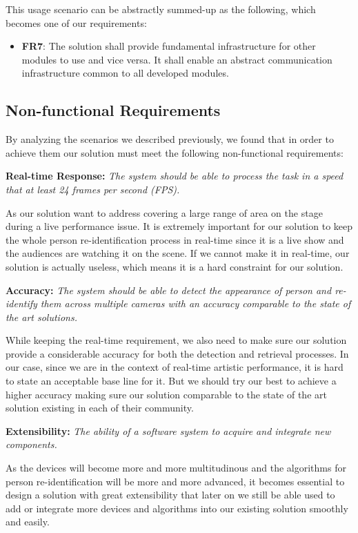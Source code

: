 This usage scenario can be abstractly summed-up as the following, which becomes
one of our requirements:

\begin{itemize}
    \item \textbf{FR7}: The solution shall provide fundamental infrastructure
    for other modules to use and vice versa. It shall enable an abstract 
    communication infrastructure common to all developed modules.
\end{itemize}

\subsection{Non-functional Requirements}
\label{sec:intro-non-func-req}

By analyzing the scenarios we described previously, we found that in order to
achieve them our solution must meet the following non-functional requirements:

\textbf{Real-time Response:} 
\textit{The system should be able to process the task in a speed that at least 
24 frames per second (FPS).}

As our solution want to address covering a large range of area on the stage 
during a live performance issue. It is extremely important for our solution to 
keep the whole person re-identification process in real-time since it is a live 
show and the audiences are watching it on the scene. If we cannot make it in 
real-time, our solution is actually useless, which means it is a hard 
constraint for our solution.

\textbf{Accuracy:} 
\textit{The system should be able to detect the appearance of person and 
re-identify them across multiple cameras with an accuracy comparable to the 
state of the art solutions.}

While keeping the real-time requirement, we also need to make sure our solution
provide a considerable accuracy for both the detection and retrieval processes.
In our case, since we are in the context of real-time artistic performance, it
is hard to state an acceptable base line for it. But we should try our best to
achieve a higher accuracy making sure our solution comparable to the state of
the art solution existing in each of their community.

\textbf{Extensibility:}
\textit{The ability of a software system to acquire and integrate new
components.}

As the devices will become more and more multitudinous and the algorithms for
person re-identification will be more and more advanced, it becomes essential
to design a solution with great extensibility that later on we still
be able used to add or integrate more devices and algorithms into our existing
solution smoothly and easily.

